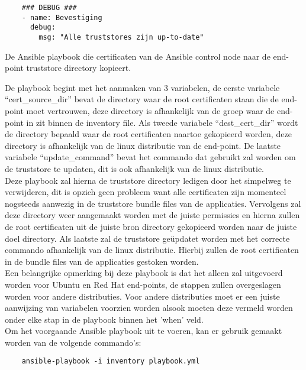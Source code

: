 \begin{listing}[H]\ContinuedFloat
\begin{verbatim}
    ### DEBUG ###
    - name: Bevestiging
      debug:
        msg: "Alle truststores zijn up-to-date"
\end{verbatim}
\caption[]{De Ansible playbook die certificaten van de Ansible control node naar de end-point truststore directory kopieert.}
\end{listing}

De playbook begint met het aanmaken van 3 variabelen, de eerste variabele ``cert\_source\_dir'' bevat de directory waar de root certificaten staan die de end-point moet vertrouwen, deze directory is afhankelijk van de groep waar de end-point in zit binnen de inventory file.
Als tweede variabele ``dest\_cert\_dir'' wordt de directory bepaald waar de root certificaten naartoe gekopieerd worden, deze directory is afhankelijk van de linux distributie van de end-point.
De laatste variabele ``update\_command'' bevat het commando dat gebruikt zal worden om de truststore te updaten, dit is ook afhankelijk van de linux distributie. \\

Deze playbook zal hierna de truststore directory ledigen door het simpelweg te verwijderen, dit is opzich geen probleem want alle certificaten zijn momenteel nogsteeds aanwezig in de truststore bundle files van de applicaties.
Vervolgens zal deze directory weer aangemaakt worden met de juiste permissies en hierna zullen de root certificaten uit de juiste bron directory gekopieerd worden naar de juiste doel directory.
Als laatste zal de truststore geüpdatet worden met het correcte commando afhankelijk van de linux distributie. Hierbij zullen de root certificaten in de bundle files van de applicaties gestoken worden. \\

Een belangrijke opmerking bij deze playbook is dat het alleen zal uitgevoerd worden voor Ubuntu en Red Hat end-points, de stappen zullen overgeslagen worden voor andere distributies. 
Voor andere distributies moet er een juiste aanwijzing van variabelen voorzien worden alsook moeten deze vermeld worden onder elke stap in de playbook binnen het 'when' veld. \\

Om het voorgaande Ansible playbook uit te voeren, kan er gebruik gemaakt worden van de volgende commando's:
\begin{verbatim}
    ansible-playbook -i inventory playbook.yml
\end{verbatim}

